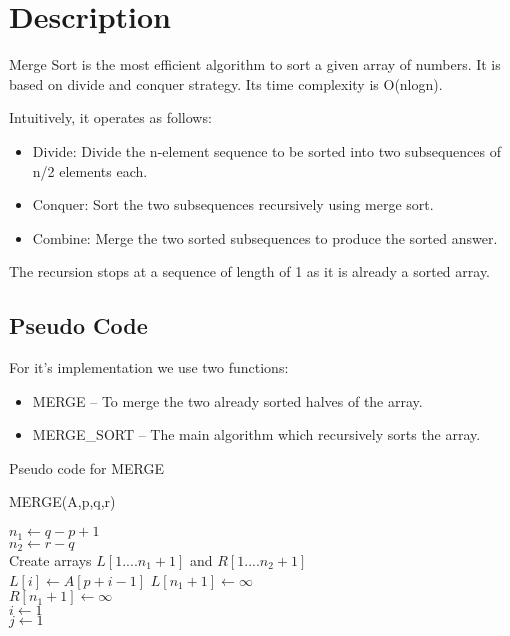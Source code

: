 \documentclass{article}
\author{Varun Khare}
\date{Feburary 2017 }
\begin{document}
\maketitle
\section{Description}
Merge Sort is the most efficient algorithm to sort a given array of numbers. It is based on divide and conquer strategy. Its time complexity is O(nlogn). 

Intuitively, it operates as follows:
\begin{itemize}

	\item Divide: Divide the n-element sequence to be sorted into two subsequences of n/2 elements each.
	\item Conquer: Sort the two subsequences recursively using merge sort.
	\item Combine: Merge the two sorted subsequences to produce the sorted answer.
\end{itemize}    

		The recursion stops at a sequence of length of 1 as it is already a sorted array.
\subsection{Pseudo Code}

		For it's implementation we use two functions:
		\begin{itemize}
			\item MERGE -- To merge the two already sorted halves of the array.
			\item MERGE\_SORT -- The main algorithm which recursively sorts the array. 
		\end{itemize}	

		Pseudo code for MERGE\\
		\begin{algorithm}[H]
			\caption{MERGE(A,p,q,r)}
			\SetAlgoLined 
			$n_1 \gets q-p+1$ \\ 
			$n_2 \gets r-q$ \\
			Create arrays $L[1 .... n_1 + 1] $ and $ R[1 .... n_2 + 1]$ \\
			 {
				$L[i] \gets A[p + i -1]$ 
			}
			$L[n_1 + 1] \gets \infty$ \\
			$R[n_1 + 1] \gets \infty$ \\
			$i \gets 1$ \\
			$j \gets 1$ \\
		\end{algorithm}
        \newpage
		
\end{document}
